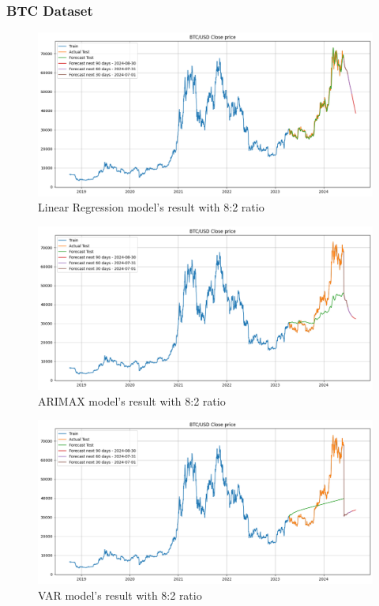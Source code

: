 \documentclass{ieeeojies}
\begin{document}
\subsubsection{BTC Dataset}
\begin{figure}[H]
    \centering
    \includegraphics[width=0.8\linewidth]{./././visualize/LinearRegression/BTC-80-20.png}
    \caption{Linear Regression model’s result with 8:2 ratio}
    \label{fig:12}
\end{figure}
\begin{figure}[H]
    \centering
    \includegraphics[width=0.8\linewidth]{./././visualize/ARIMAX/BTC-80-20.png}
    \caption{ARIMAX model’s result with 8:2 ratio}
    \label{fig:13}
\end{figure}
\begin{figure}[H]
    \centering
    \includegraphics[width=0.8\linewidth]{./././visualize/VAR/BTC-80-20.png}
    \caption{VAR model’s result with 8:2 ratio}
    \label{fig:14}
\end{figure}
\end{document}
